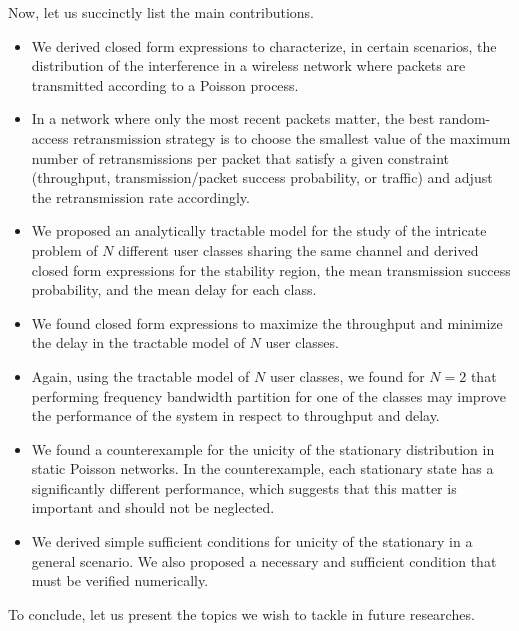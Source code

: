 \vspace{5mm}
Now, let us succinctly list the main contributions.
\begin{itemize}
    \item We derived closed form expressions to characterize, in certain scenarios, the distribution of the interference in a wireless network where packets are transmitted according to a Poisson process.
    
    \item In a network where only the most recent packets matter, the best random-access retransmission strategy is to choose the smallest value of the maximum number of retransmissions per packet that satisfy a given constraint (throughput, transmission/packet success probability, or traffic) and adjust the retransmission rate accordingly.
    
    \item We proposed an analytically tractable model for the study of the intricate problem of $N$ different user classes sharing the same channel and derived closed form expressions for the stability region, the mean transmission success probability, and the mean delay for each class.
    
    \item We found closed form expressions to maximize the throughput and minimize the delay in the tractable model of $N$ user classes.
    
    \item Again, using the tractable model of $N$ user classes, we found for $N=2$ that performing frequency bandwidth partition for one of the classes may improve the performance of the system in respect to throughput and delay.
    
    \item We found a counterexample for the unicity of the stationary distribution in static Poisson networks. In the counterexample, each stationary state has a significantly different performance, which suggests that this matter is important and should not be neglected.
    
    \item We derived simple sufficient conditions for unicity of the stationary in a general scenario. We also proposed a necessary and sufficient condition that must be verified numerically.
\end{itemize}

\vspace{5mm}
To conclude, let us present the topics we wish to tackle in future researches.

